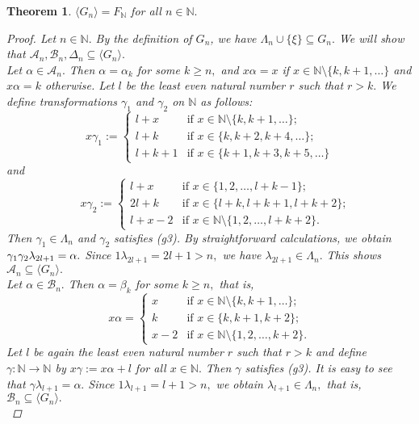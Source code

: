 \documentclass[11pt]{article}
\theoremstyle{plain}
\newtheorem{theorem}{Theorem}[section]
\theoremstyle{definition}
\begin{document}
\begin{theorem}\label{Theorem10}
$\langle G_{n}\rangle=F_{\mathbb{N}}$ for all $n\in\mathbb{N}.$
\begin{proof}
Let $n\in\mathbb{N}.$ By the definition of $G_{n}$, we have $\Lambda_{n}\cup\{\xi\}\subseteq G_{n}.$ We will show that $\mathcal{A}_{n},\mathcal{B}_{n},\Delta_{n}\subseteq \langle G_{n}\rangle.$\\

Let $\alpha\in\mathcal{A}_{n}.$ Then $\alpha=\alpha_{k}$ for some $k\geq n,$ and $x\alpha=x$ if $x\in\mathbb{N}\setminus\{k,k+1,\ldots\}$ and $x\alpha=k$ otherwise. Let $l$ be the least even natural number $r$ such that $r>k.$ We define transformations $\gamma_{1}$ and $\gamma_{2}$ on $\mathbb{N}$ as follows:
$$x\gamma_{1}:=\begin{cases}
l+x~~&\text{if }x\in\mathbb{N}\setminus\{k,k+1,\ldots\};\\
l+k&\text{if }x\in\{k,k+2,k+4,\ldots\};\\
l+k+1&\text{if }x\in\{k+1,k+3,k+5,\ldots\}
\end{cases}$$
and
$$~~~~~x\gamma_{2}:=\begin{cases}
l+x~~&\text{if }x\in\{1,2,\ldots,l+k-1\};\\
2l+k&\text{if }x\in\{l+k,l+k+1,l+k+2\};\\
l+x-2&\text{if }x\in\mathbb{N}\setminus\{1,2,\ldots,l+k+2\}.
\end{cases}$$
Then $\gamma_{1}\in\Lambda_{n}$ and $\gamma_{2}$ satisfies (g3). By straightforward calculations, we obtain $\gamma_{1}\gamma_{2}\lambda_{2l+1}\\=\alpha.$ Since $1\lambda_{2l+1}=2l+1>n,$ we have $\lambda_{2l+1}\in\Lambda_{n}.$ This shows $\mathcal{A}_{n}\subseteq\langle G_{n}\rangle.$\\

Let $\alpha\in\mathcal{B}_{n}.$ Then $\alpha=\beta_{k}$ for some $k\geq n,$ that is,
$$x\alpha=\begin{cases}
x~~&\text{if }x\in\mathbb{N}\setminus\{k,k+1,\ldots\};\\
k&\text{if }x\in\{k,k+1,k+2\};\\
x-2&\text{if }x\in\mathbb{N}\setminus\{1,2,\ldots,k+2\}. 
\end{cases}$$
Let $l$ be again the least even natural number $r$ such that $r>k$ and define $\gamma:\mathbb{N}\to\mathbb{N}$ by $x\gamma:=x\alpha+l$ for all $x\in\mathbb{N}.$ Then $\gamma$ satisfies (g3). It is easy to see that $\gamma\lambda_{l+1}=\alpha.$ Since $1\lambda_{l+1}=l+1>n,$ we obtain $\lambda_{l+1}\in\Lambda_{n},$ that is, $\mathcal{B}_{n}\subseteq\langle G_{n}\rangle.$\\


\end{proof}
\end{theorem}
\end{document}
